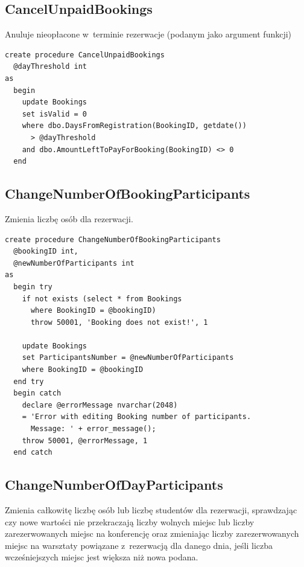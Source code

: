 \documentclass[12pt, a4paper]{mwrep}
\begin{document}
\subsection{CancelUnpaidBookings}

\noindent Anuluje nieopłacone w~terminie rezerwacje (podanym jako argument funkcji)

\begin{lstlisting}
create procedure CancelUnpaidBookings
  @dayThreshold int
as
  begin
    update Bookings
    set isValid = 0
    where dbo.DaysFromRegistration(BookingID, getdate()) 
      > @dayThreshold
    and dbo.AmountLeftToPayForBooking(BookingID) <> 0
  end
\end{lstlisting}

\subsection{ChangeNumberOfBookingParticipants}

\noindent Zmienia liczbę osób dla rezerwacji.

\begin{lstlisting}
create procedure ChangeNumberOfBookingParticipants
  @bookingID int,
  @newNumberOfParticipants int
as
  begin try
    if not exists (select * from Bookings 
      where BookingID = @bookingID)
      throw 50001, 'Booking does not exist!', 1

    update Bookings
    set ParticipantsNumber = @newNumberOfParticipants
    where BookingID = @bookingID
  end try
  begin catch
    declare @errorMessage nvarchar(2048)
    = 'Error with editing Booking number of participants. 
      Message: ' + error_message();
    throw 50001, @errorMessage, 1
  end catch
\end{lstlisting}

\subsection{ChangeNumberOfDayParticipants}

\noindent Zmienia całkowitę liczbę osób lub liczbę studentów dla rezerwacji, sprawdzając czy nowe wartości nie przekraczają liczby wolnych miejsc lub liczby zarezerwowanych miejsc na konferencję oraz zmieniając liczby zarezerwowanych miejsc na warsztaty powiązane z~rezerwacją dla danego dnia, jeśli liczba wcześniejszych miejsc jest większa niż nowa podana.
\end{document}
